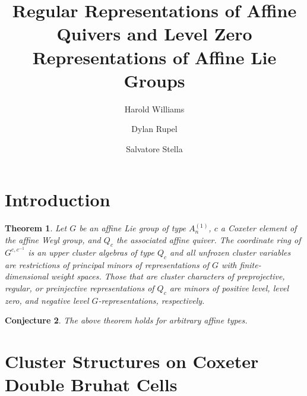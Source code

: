 \documentclass[11pt]{amsart}
\newtheorem{theorem}{Theorem}[section]
\newtheorem{conjecture}[theorem]{Conjecture}
\begin{document}
\title{Regular Representations of Affine Quivers and Level Zero Representations of Affine Lie Groups}

\author{Harold Williams}
\address{Harold Williams\newline
University of Texas at Austin\newline
Department of Mathematics\newline
Austin TX 78712\newline
USA}

\author[Rupel]{Dylan Rupel}
\address[Dylan Rupel]{University of Notre Dame}

\author[Stella]{Salvatore Stella}
\address[Salvatore Stella]{Universit\`a degli studi di Roma ``La Sapienza''}

\begin{abstract}
\end{abstract}

\maketitle

\section{Introduction}

\begin{theorem}\label{thm:maintheorem}
Let $G$ be an affine Lie group of type $A_n^{(1)}$, $c$ a Coxeter element of the affine Weyl group, and $Q_c$ the associated affine quiver.  The coordinate ring of $G^{c,c^{-1}}$ is an upper cluster algebras of type $Q_c$ and all unfrozen cluster variables are restrictions of principal minors of representations of $G$ with finite-dimensional weight spaces.  Those that are cluster characters of preprojective, regular, or preinjective representations of $Q_c$ are minors of positive level, level zero, and negative level $G$-representations, respectively.
\end{theorem}

\begin{conjecture}\label{conj:mainconjecture}
The above theorem holds for arbitrary affine types.
\end{conjecture}

\section{Cluster Structures on Coxeter Double Bruhat Cells}
\end{document}
